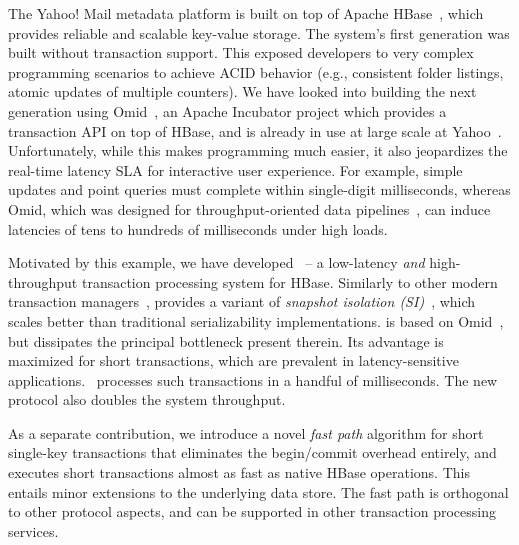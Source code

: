 The Yahoo! Mail metadata platform is built on top of Apache HBase~\cite{hbase}, 
which provides reliable and scalable key-value storage. The system's first generation
was built without transaction support. This exposed  developers to very complex programming scenarios 
to achieve ACID behavior (e.g., consistent folder listings, atomic updates of multiple counters). 
We have looked into building the next generation using  Omid~\cite{omid}, 
an Apache Incubator project which provides a transaction API on top of HBase, and 
is already in use at large scale at Yahoo~\cite{Omid2017}.
Unfortunately, while this makes programming much easier, it also jeopardizes 
the real-time latency SLA for interactive user experience. For example,  
simple updates and point queries must complete within single-digit milliseconds, 
whereas Omid, which was designed for throughput-oriented data pipelines~\cite{Omid2017}, 
can induce latencies of tens to hundreds of milliseconds under high loads. 

Motivated by this example, we have developed {\sys\/}~-- a low-latency {\em and\/} high-throughput 
transaction processing system for HBase. Similarly to other modern transaction 
managers~\cite{Percolator2010,Spanner2012,Omid2017,cockroach},
{\sys\/} provides a variant of \emph{snapshot isolation (SI)}~\cite{DBLP:conf/sigmod/BerensonBGMOO95},
which scales better than traditional serializability implementations. {\sys\/} is based on Omid~\cite{omid}, 
but dissipates the principal bottleneck present therein.
Its advantage is maximized for short  transactions, which are prevalent in latency-sensitive applications.
\sys\ processes  such transactions in a handful of milliseconds. The new protocol  also doubles the system 
throughput.

As a separate contribution, we introduce a novel {\em fast path\/} algorithm for short single-key transactions 
that eliminates the begin/commit overhead entirely, and executes short transactions 
 almost as fast as native HBase operations. This entails minor extensions to the underlying 
data store. The fast path is orthogonal to other protocol aspects, and can be  supported in other 
transaction processing services. 

